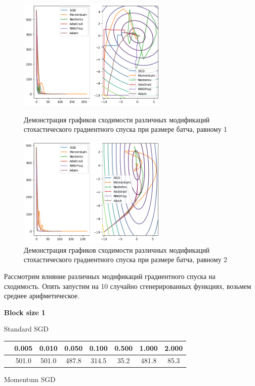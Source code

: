 \documentclass[a4paper,14pt,oneside,openany]{memoir}
\begin{document}
	\begin{figure}[ht]
		\centering
		\includegraphics[width=0.65\textwidth]{img/3_1.png}
  \caption{Демонстрация графиков сходимости различных модификаций стохастического градиентного спуска при размере батча, равному 1}
  \includegraphics[width=0.65\textwidth]{img/3_2.png}
  	  \caption{Демонстрация графиков сходимости различных модификаций стохастического градиентного спуска при размере батча, равному 2}
	\end{figure}
	
	Рассмотрим влияние различных модификаций градиентного спуска на сходимость. Опять запустим на 10 случайно сгенерированных функциях, возьмем среднее арифметическое.
	
	\textbf{Block size 1}
	
	Standard SGD 
	
	\begin{tabular}{|c|c|c|c|c|c|c|c|}
	\hline 
	 &0.005 &0.010 &0.050 &0.100 &0.500 &1.000 &2.000 \\
	 \hline 
	 &501.0 &501.0 &487.8 &314.5 &35.2 &481.8 &85.3 \\
	 \hline 
	
	\end{tabular}
	
	Momentum SGD 
	
\end{document}
